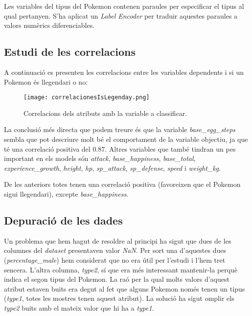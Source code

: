 \documentclass[a4paper, 11pt]{article}
\begin{document}
    Les variables del tipus del Pokemon contenen paraules per especificar el tipus al qual pertanyen.
    S'ha aplicat un \textit{Label Encoder} per traduir aquestes paraules a valors numèrics
    diferenciables.

    \newpage
    \subsection{Estudi de les correlacions}

    A continuació es presenten les correlacions entre les variables dependents i si un Pokemon és
    llegendari o no:

    \begin{figure}[H]
        \centering
        \texttt{[image: correlacionesIsLegenday.png]}
        \caption{Correlacions dels atributs amb la variable a classificar.}
    \end{figure}

    La conclusió més directa que podem treure és que la variable \textit{base\_egg\_steps}
    sembla que pot descriure molt bé el comportament de la variable objectiu, ja que té una
    correlació positiva del $0.87$. Altres variables que també tindran un pes important en
    els models són \textit{attack}, \textit{base\_happiness}, \textit{base\_total}, \textit{experience\_growth},
    \textit{height}, \textit{hp}, \textit{sp\_attack}, \textit{sp\_defense}, \textit{speed}
    i \textit{weight\_kg}.

    De les anteriors totes tenen una correlació positiva (favoreixen que el Pokemon sigui llegendari), excepte \textit{base\_happiness}.

    \newpage
    \subsection{Depuració de les dades}
    Un problema que hem hagut de resoldre al principi ha sigut que dues de les columnes del \textit{dataset} presentaven valor \textit{NaN}. Per sort una d'aquestes dues (\textit{percentage\_male}) hem considerat que no era útil per l'estudi i l'hem tret sencera. L'altra columna, \textit{type2}, sí que era més interessant mantenir-la perquè indica el segon tipus del Pokemon. La raó per la qual molts valors d'aquest atribut estaven buits era degut al fet que alguns Pokemon només tenen un tipus (\textit{type1}, totes les mostres tenen aquest atribut). La solució ha sigut omplir els \textit{type2} buits amb el mateix valor que hi ha a \textit{type1}.
\end{document}
